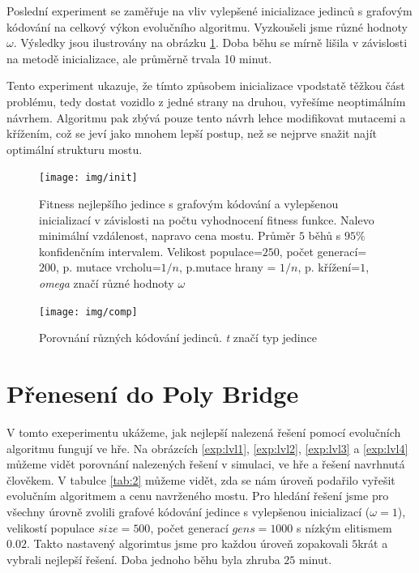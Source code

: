 Poslední experiment se zaměřuje na vliv vylepšené inicializace jedinců s grafovým kódování na celkový výkon evolučního algoritmu. Vyzkoušeli jsme různé hodnoty $\omega$. Výsledky jsou ilustrovány na obrázku \ref{exp:9}. Doba běhu se mírně lišila v závislosti na metodě inicializace, ale průměrně trvala 10 minut.

Tento experiment ukazuje, že tímto způsobem inicializace vpodstatě těžkou část problému, tedy dostat vozidlo z jedné strany na druhou, vyřešíme neoptimálním návrhem. Algoritmu pak zbývá pouze tento návrh lehce modifikovat mutacemi a křížením, což se jeví jako mnohem lepší postup, než se nejprve snažit najít optimální strukturu mostu. 

\begin{figure}[p]\centering
\texttt{[image: img/init]}
\caption{Fitness nejlepšího jedince s grafovým kódování a vylepšenou inicializací v závislosti na počtu vyhodnocení fitness funkce. Nalevo minimální vzdálenost, napravo cena mostu. Průměr $5$ běhů s $95\%$ konfidenčním intervalem. Velikost populace=$250$, počet generací=$200$, p. mutace vrcholu=$1/n$, p.mutace hrany = $1/n$, p. křížení=$1$, \emph{omega} značí různé hodnoty $\omega$}
\label{exp:9}
\end{figure}


\begin{figure}[p]\centering
\texttt{[image: img/comp]}
\caption{Porovnání různých kódování jedinců. \emph{t} značí typ jedince}
\label{zaver:1}
\end{figure}


\section{Přenesení do Poly Bridge}

V tomto exeperimentu ukážeme, jak nejlepší nalezená řešení pomocí evolučních algoritmu fungují ve hře. Na obrázcích \ref{exp:lvl1}, \ref{exp:lvl2}, \ref{exp:lvl3} a \ref{exp:lvl4} můžeme vidět porovnání nalezených řešení v simulaci, ve hře a řešení navrhnutá člověkem. V tabulce \ref{tab:2} můžeme vidět, zda se nám úroveň podařilo vyřešit evolučním algoritmem a cenu navrženého mostu. Pro hledání řešení jsme pro všechny úrovně zvolili grafové kódování jedince s vylepšenou inicializací ($\omega=1$), velikostí populace $size=500$, počet generací $gens=1000$ s nízkým elitismem $0.02$. Takto nastavený algorimtus jsme pro každou úroveň zopakovali $5$krát a vybrali nejlepší řešení. Doba jednoho běhu byla zhruba $25$ minut.

